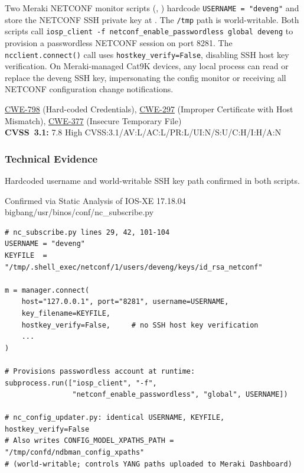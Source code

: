 \documentclass[11pt,a4paper]{article}
\begin{document}
\begin{overviewbox}
Two Meraki NETCONF monitor scripts (, )
hardcode \texttt{USERNAME~=~"deveng"} and store the NETCONF SSH private key at
. The \texttt{/tmp}
path is world-writable. Both scripts call \texttt{iosp\_client -f netconf\_enable\_passwordless
global deveng} to provision a passwordless NETCONF session on port 8281. The
\texttt{ncclient.connect()} call uses \texttt{hostkey\_verify=False}, disabling SSH host
key verification. On Meraki-managed Cat9K devices, any local process can read or replace
the deveng SSH key, impersonating the config monitor or receiving all NETCONF configuration
change notifications.

\href{https://cwe.mitre.org/data/definitions/798.html}{CWE-798} (Hard-coded Credentials),
\href{https://cwe.mitre.org/data/definitions/297.html}{CWE-297} (Improper Certificate with Host Mismatch),
\href{https://cwe.mitre.org/data/definitions/377.html}{CWE-377} (Insecure Temporary File)\\
\textbf{CVSS~3.1:} 7.8 High \quad CVSS:3.1/AV:L/AC:L/PR:L/UI:N/S:U/C:H/I:H/A:N
\end{overviewbox}

\subsubsection{Technical Evidence}

Hardcoded username and world-writable SSH key path confirmed in both scripts.

\begin{pocbox}{Confirmed via Static Analysis of IOS-XE 17.18.04 bigbang/usr/binos/conf/nc\_subscribe.py}
\begin{lstlisting}[style=bash]
# nc_subscribe.py lines 29, 42, 101-104
USERNAME = "deveng"
KEYFILE  = "/tmp/.shell_exec/netconf/1/users/deveng/keys/id_rsa_netconf"

m = manager.connect(
    host="127.0.0.1", port="8281", username=USERNAME,
    key_filename=KEYFILE,
    hostkey_verify=False,     # no SSH host key verification
    ...
)

# Provisions passwordless account at runtime:
subprocess.run(["iosp_client", "-f",
                "netconf_enable_passwordless", "global", USERNAME])

# nc_config_updater.py: identical USERNAME, KEYFILE, hostkey_verify=False
# Also writes CONFIG_MODEL_XPATHS_PATH = "/tmp/confd/ndbman_config_xpaths"
# (world-writable; controls YANG paths uploaded to Meraki Dashboard)
\end{lstlisting}
\end{pocbox}
\end{document}
